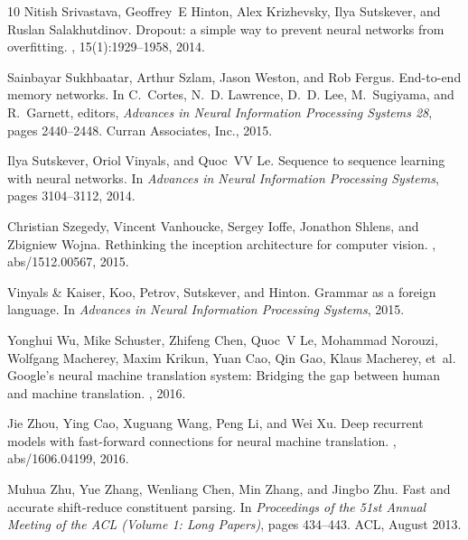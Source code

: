 \documentclass{article}
\begin{document}
\begin{thebibliography}{10}
Nitish Srivastava, Geoffrey~E Hinton, Alex Krizhevsky, Ilya Sutskever, and
  Ruslan Salakhutdinov.
\newblock Dropout: a simple way to prevent neural networks from overfitting.
, 15(1):1929--1958, 2014.

Sainbayar Sukhbaatar, Arthur Szlam, Jason Weston, and Rob Fergus.
\newblock End-to-end memory networks.
\newblock In C.~Cortes, N.~D. Lawrence, D.~D. Lee, M.~Sugiyama, and R.~Garnett,
  editors, {\em Advances in Neural Information Processing Systems 28}, pages
  2440--2448. Curran Associates, Inc., 2015.

Ilya Sutskever, Oriol Vinyals, and Quoc~VV Le.
\newblock Sequence to sequence learning with neural networks.
\newblock In {\em Advances in Neural Information Processing Systems}, pages
  3104--3112, 2014.

Christian Szegedy, Vincent Vanhoucke, Sergey Ioffe, Jonathon Shlens, and
  Zbigniew Wojna.
\newblock Rethinking the inception architecture for computer vision.
, abs/1512.00567, 2015.

{Vinyals {\&} Kaiser}, Koo, Petrov, Sutskever, and Hinton.
\newblock Grammar as a foreign language.
\newblock In {\em Advances in Neural Information Processing Systems}, 2015.

Yonghui Wu, Mike Schuster, Zhifeng Chen, Quoc~V Le, Mohammad Norouzi, Wolfgang
  Macherey, Maxim Krikun, Yuan Cao, Qin Gao, Klaus Macherey, et~al.
\newblock Google's neural machine translation system: Bridging the gap between
  human and machine translation.
, 2016.

Jie Zhou, Ying Cao, Xuguang Wang, Peng Li, and Wei Xu.
\newblock Deep recurrent models with fast-forward connections for neural
  machine translation.
, abs/1606.04199, 2016.

Muhua Zhu, Yue Zhang, Wenliang Chen, Min Zhang, and Jingbo Zhu.
\newblock Fast and accurate shift-reduce constituent parsing.
\newblock In {\em Proceedings of the 51st Annual Meeting of the ACL (Volume 1:
  Long Papers)}, pages 434--443. ACL, August 2013.

\end{thebibliography}

\pagebreak
\end{document}
